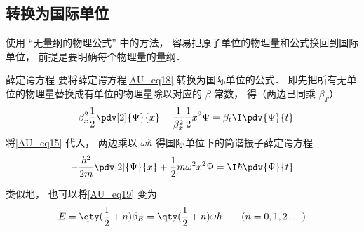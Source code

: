 \subsection{转换为国际单位}
使用 “无量纲的物理公式” 中的方法， 容易把原子单位的物理量和公式换回到国际单位， 前提是要明确每个物理量的量纲．

\begin{example}{薛定谔方程}
要将薛定谔方程\autoref{AU_eq18} 转换为国际单位的公式． 即先把所有无单位的物理量替换成有单位的物理量除以对应的 $\beta$ 常数， 得（两边已同乘 $\beta_\Psi$）
\begin{equation}
-\beta_x^2\frac12 \pdv[2]{\Psi}{x} + \frac{1}{\beta_x^2}\frac12 x^2 \Psi= \beta_t\I\pdv{\Psi}{t}
\end{equation}
将\autoref{AU_eq15} 代入， 两边乘以 $\omega\hbar$ 得国际单位下的简谐振子薛定谔方程
\begin{equation}
-\frac{\hbar^2}{2m} \pdv[2]{\Psi}{x} + \frac12 m\omega^2 x^2 \Psi= \I\hbar\pdv{\Psi}{t}
\end{equation}

类似地， 也可以将\autoref{AU_eq19} 变为
\begin{equation}
E =  \qty(\frac12 + n)\beta_E = \qty(\frac12 + n)\omega\hbar \qquad (n = 0, 1, 2\dots)
\end{equation}
\end{example}
